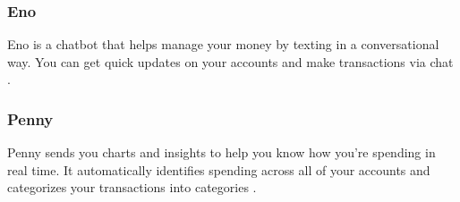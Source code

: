 \subsubsection{Eno}
Eno is a chatbot that helps manage your money by texting in a conversational way. You can get quick updates on your accounts and make transactions via chat \cite{eno}.

\subsubsection{Penny}
Penny sends you charts and insights to help you know how you're spending in real time. It automatically identifies spending across all of your accounts and categorizes your transactions into categories \cite{penny}.